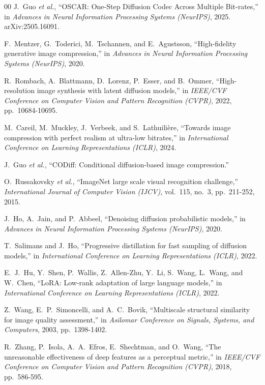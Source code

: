 \documentclass[conference]{IEEEtran}
\begin{document}
\begin{thebibliography}{00}
 J.~Guo \emph{et al.}, ``OSCAR: One-Step Diffusion Codec Across Multiple Bit-rates,'' in \emph{Advances in Neural Information Processing Systems (NeurIPS)}, 2025. arXiv:2505.16091.

 F.~Mentzer, G.~Toderici, M.~Tschannen, and E.~Agustsson, ``High-fidelity generative image compression,'' in \emph{Advances in Neural Information Processing Systems (NeurIPS)}, 2020.

 R.~Rombach, A.~Blattmann, D.~Lorenz, P.~Esser, and B.~Ommer, ``High-resolution image synthesis with latent diffusion models,'' in \emph{IEEE/CVF Conference on Computer Vision and Pattern Recognition (CVPR)}, 2022, pp.~10684-10695.

 M.~Careil, M.~Muckley, J.~Verbeek, and S.~Lathuili\`{e}re, ``Towards image compression with perfect realism at ultra-low bitrates,'' in \emph{International Conference on Learning Representations (ICLR)}, 2024.

 J.~Guo \emph{et al.}, ``CODiff: Conditional diffusion-based image compression.'' %

 O.~Russakovsky \emph{et al.}, ``ImageNet large scale visual recognition challenge,'' \emph{International Journal of Computer Vision (IJCV)}, vol.~115, no.~3, pp.~211-252, 2015.

 J.~Ho, A.~Jain, and P.~Abbeel, ``Denoising diffusion probabilistic models,'' in \emph{Advances in Neural Information Processing Systems (NeurIPS)}, 2020.

 T.~Salimans and J.~Ho, ``Progressive distillation for fast sampling of diffusion models,'' in \emph{International Conference on Learning Representations (ICLR)}, 2022.

 E.~J.~Hu, Y.~Shen, P.~Wallis, Z.~Allen-Zhu, Y.~Li, S.~Wang, L.~Wang, and W.~Chen, ``LoRA: Low-rank adaptation of large language models,'' in \emph{International Conference on Learning Representations (ICLR)}, 2022.

 Z.~Wang, E.~P.~Simoncelli, and A.~C.~Bovik, ``Multiscale structural similarity for image quality assessment,'' in \emph{Asilomar Conference on Signals, Systems, and Computers}, 2003, pp.~1398-1402.

 R.~Zhang, P.~Isola, A.~A.~Efros, E.~Shechtman, and O.~Wang, ``The unreasonable effectiveness of deep features as a perceptual metric,'' in \emph{IEEE/CVF Conference on Computer Vision and Pattern Recognition (CVPR)}, 2018, pp.~586-595.


\end{thebibliography}
\end{document}
